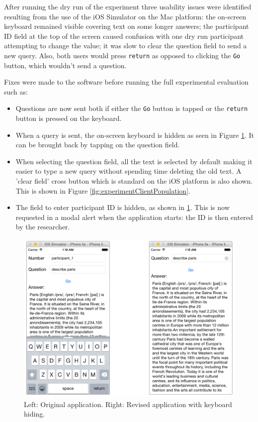 \documentclass[authoryearcitations]{UoYCSproject}
\begin{document}
After running the dry run of the experiment three usability issues were identified resulting from the use of the iOS Simulator on the Mac platform: the on-screen keyboard remained visible covering text on some longer answers; the participant ID field at the top of the screen caused confusion with one dry run participant attempting to change the value; it was slow to clear the question field to send a new query. Also, both users would press \texttt{return} as opposed to clicking the \texttt{Go} button, which wouldn't send a question.

Fixes were made to the software before running the full experimental evaluation such as:
\begin{itemize}
  \item Questions are now sent both if either the \texttt{Go} button is tapped or the \texttt{return} button is pressed on the keyboard.
  \item When a query is sent, the on-screen keyboard is hidden as seen in Figure \ref{fig:experimentClientParis}. It can be brought back by tapping on the question field.
  \item When selecting the question field, all the text is selected by default making it easier to type a new query without spending time deleting the old text. A 'clear field' cross button which is standard on the iOS platform is also shown. This is shown in Figure \ref{fig:experimentClientPopulation}.
  \item The field to enter participant ID is hidden, as shown in \ref{fig:experimentClientParis}. This is now requested in a modal alert when the application starts: the ID is then entered by the researcher.
\end{itemize}

\begin{figure}[htb]
    \centering
    \includegraphics[width=\linewidth]{describe_paris}
    \caption{Left: Original application. Right: Revised application with keyboard hiding.}
    \label{fig:experimentClientParis}
\end{figure}
\end{document}
